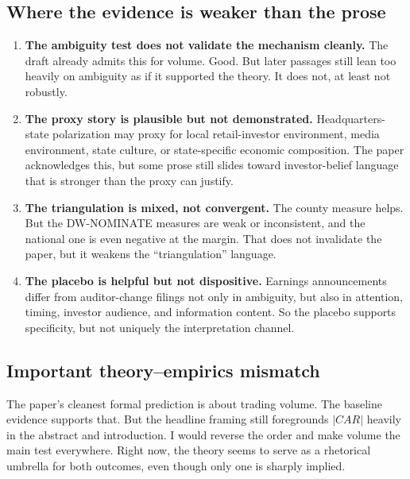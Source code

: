 \documentclass[11pt]{article}
\begin{document}
\subsection*{Where the evidence is weaker than the prose}
\begin{enumerate}
    \item \textbf{The ambiguity test does not validate the mechanism cleanly.} The draft already admits this for volume. Good. But later passages still lean too heavily on ambiguity as if it supported the theory. It does not, at least not robustly.
    \item \textbf{The proxy story is plausible but not demonstrated.} Headquarters-state polarization may proxy for local retail-investor environment, media environment, state culture, or state-specific economic composition. The paper acknowledges this, but some prose still slides toward investor-belief language that is stronger than the proxy can justify.
    \item \textbf{The triangulation is mixed, not convergent.} The county measure helps. But the DW-NOMINATE measures are weak or inconsistent, and the national one is even negative at the margin. That does not invalidate the paper, but it weakens the ``triangulation'' language.
    \item \textbf{The placebo is helpful but not dispositive.} Earnings announcements differ from auditor-change filings not only in ambiguity, but also in attention, timing, investor audience, and information content. So the placebo supports specificity, but not uniquely the interpretation channel.
\end{enumerate}

\subsection*{Important theory--empirics mismatch}
The paper's cleanest formal prediction is about trading volume. The baseline evidence supports that. But the headline framing still foregrounds $|CAR|$ heavily in the abstract and introduction. I would reverse the order and make volume the main test everywhere. Right now, the theory seems to serve as a rhetorical umbrella for both outcomes, even though only one is sharply implied.
\end{document}
